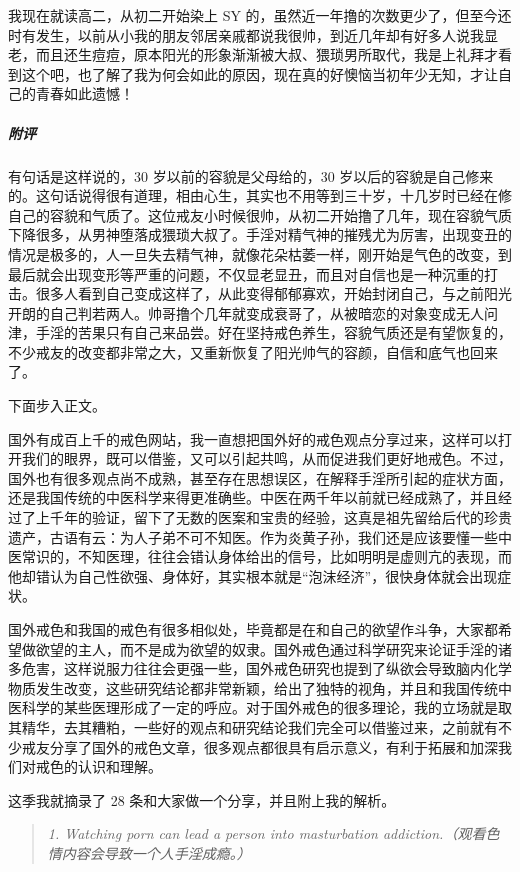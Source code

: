 \begin{case}
    我现在就读高二，从初二开始染上 SY 的，虽然近一年撸的次数更少了，但至今还时有发生，以前从小我的朋友邻居亲戚都说我很帅，到近几年却有好多人说我显老，而且还生痘痘，原本阳光的形象渐渐被大叔、猥琐男所取代，我是上礼拜才看到这个吧，也了解了我为何会如此的原因，现在真的好懊恼当初年少无知，才让自己的青春如此遗憾！
    \subparagraph{附评} 有句话是这样说的，30 岁以前的容貌是父母给的，30 岁以后的容貌是自己修来的。这句话说得很有道理，相由心生，其实也不用等到三十岁，十几岁时已经在修自己的容貌和气质了。这位戒友小时候很帅，从初二开始撸了几年，现在容貌气质下降很多，从男神堕落成猥琐大叔了。手淫对精气神的摧残尤为厉害，出现变丑的情况是极多的，人一旦失去精气神，就像花朵枯萎一样，刚开始是气色的改变，到最后就会出现变形等严重的问题，不仅显老显丑，而且对自信也是一种沉重的打击。很多人看到自己变成这样了，从此变得郁郁寡欢，开始封闭自己，与之前阳光开朗的自己判若两人。帅哥撸个几年就变成衰哥了，从被暗恋的对象变成无人问津，手淫的苦果只有自己来品尝。好在坚持戒色养生，容貌气质还是有望恢复的，不少戒友的改变都非常之大，又重新恢复了阳光帅气的容颜，自信和底气也回来了。
\end{case}

下面步入正文。

国外有成百上千的戒色网站，我一直想把国外好的戒色观点分享过来，这样可以打开我们的眼界，既可以借鉴，又可以引起共鸣，从而促进我们更好地戒色。不过，国外也有很多观点尚不成熟，甚至存在思想误区，在解释手淫所引起的症状方面，还是我国传统的中医科学来得更准确些。中医在两千年以前就已经成熟了，并且经过了上千年的验证，留下了无数的医案和宝贵的经验，这真是祖先留给后代的珍贵遗产，古语有云：为人子弟不可不知医。作为炎黄子孙，我们还是应该要懂一些中医常识的，不知医理，往往会错认身体给出的信号，比如明明是虚则亢的表现，而他却错认为自己性欲强、身体好，其实根本就是“泡沫经济”，很快身体就会出现症状。

国外戒色和我国的戒色有很多相似处，毕竟都是在和自己的欲望作斗争，大家都希望做欲望的主人，而不是成为欲望的奴隶。国外戒色通过科学研究来论证手淫的诸多危害，这样说服力往往会更强一些，国外戒色研究也提到了纵欲会导致脑内化学物质发生改变，这些研究结论都非常新颖，给出了独特的视角，并且和我国传统中医科学的某些医理形成了一定的呼应。对于国外戒色的很多理论，我的立场就是取其精华，去其糟粕，一些好的观点和研究结论我们完全可以借鉴过来，之前就有不少戒友分享了国外的戒色文章，很多观点都很具有启示意义，有利于拓展和加深我们对戒色的认识和理解。

这季我就摘录了 28 条和大家做一个分享，并且附上我的解析。

\begin{quote}\it
    1. Watching porn can lead a person into masturbation addiction.（观看色情内容会导致一个人手淫成瘾。）
\end{quote}

